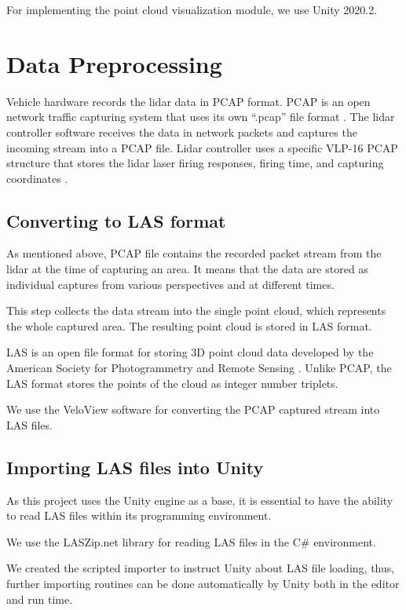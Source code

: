 For implementing the point cloud visualization module, we use Unity 2020.2.


\section{Data Preprocessing}

Vehicle hardware records the lidar data in PCAP format. PCAP is an open network traffic capturing system that uses its own “.pcap” file format \cite{PcapSpec}. The lidar controller software receives the data in network packets and captures the incoming stream into a PCAP file. Lidar controller uses a specific VLP-16 PCAP structure that stores the lidar laser firing responses, firing time, and capturing coordinates \cite{Vlp16PcapSpec}.

\subsection{Converting to LAS format}

As mentioned above, PCAP file contains the recorded packet stream from the lidar at the time of capturing an area. It means that the data are stored as individual captures from various perspectives and at different times.

This step collects the data stream into the single point cloud, which represents the whole captured area. The resulting point cloud is stored in LAS format.

LAS is an open file format for storing 3D point cloud data developed by the American Society for Photogrammetry and Remote Sensing \cite{LasR15}. Unlike PCAP, the LAS format stores the points of the cloud as integer number triplets.

We use the VeloView software for converting the PCAP captured stream into LAS files.

\subsection{Importing LAS files into Unity}

As this project uses the Unity engine as a base, it is essential to have the ability to read LAS files within its programming environment. 

We use the LASZip.net library for reading LAS files in the C\# environment.

We created the scripted importer \cite{UnityManScriptedImporters} to instruct Unity about LAS file loading, thus, further importing routines can be done automatically by Unity both in the editor and run time.


